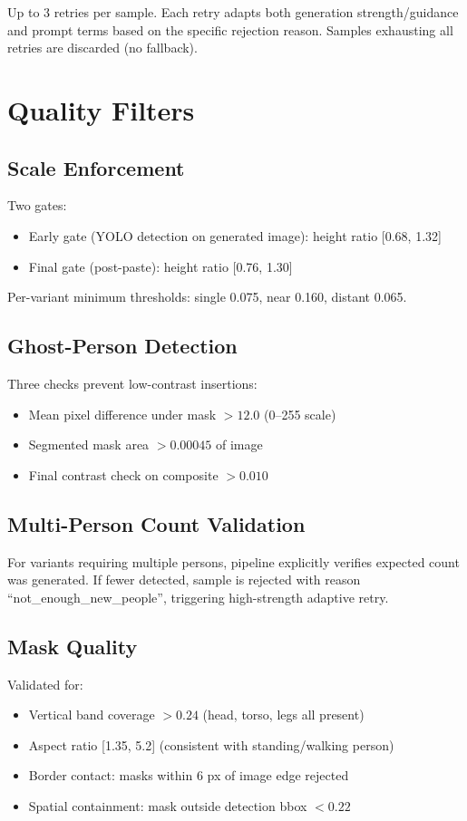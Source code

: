\documentclass[12pt,a4paper]{article}
\begin{document}
Up to 3 retries per sample. Each retry adapts both generation strength/guidance and prompt terms based on the specific rejection reason. Samples exhausting all retries are discarded (no fallback).

\section{Quality Filters}

\subsection{Scale Enforcement}
Two gates:
\begin{itemize}
    \item Early gate (YOLO detection on generated image): height ratio [0.68, 1.32]
    \item Final gate (post-paste): height ratio [0.76, 1.30]
\end{itemize}
Per-variant minimum thresholds: single 0.075, near 0.160, distant 0.065.

\subsection{Ghost-Person Detection}
Three checks prevent low-contrast insertions:
\begin{itemize}
    \item Mean pixel difference under mask $> 12.0$ (0--255 scale)
    \item Segmented mask area $> 0.00045$ of image
    \item Final contrast check on composite $> 0.010$
\end{itemize}

\subsection{Multi-Person Count Validation}
For variants requiring multiple persons, pipeline explicitly verifies expected count was generated. If fewer detected, sample is rejected with reason ``not\_enough\_new\_people'', triggering high-strength adaptive retry.

\subsection{Mask Quality}
Validated for:
\begin{itemize}
    \item Vertical band coverage $> 0.24$ (head, torso, legs all present)
    \item Aspect ratio [1.35, 5.2] (consistent with standing/walking person)
    \item Border contact: masks within 6 px of image edge rejected
    \item Spatial containment: mask outside detection bbox $< 0.22$
\end{itemize}
\end{document}
